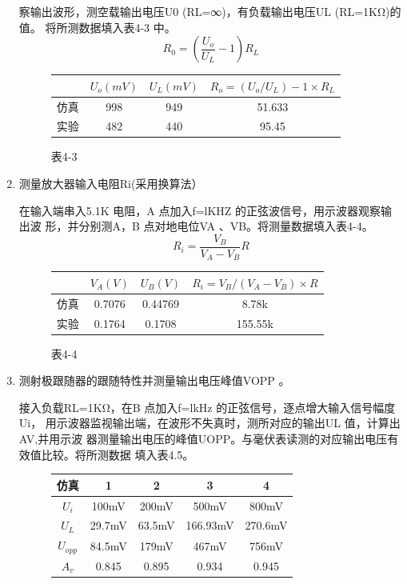 \documentclass[a4paper,10pt,notitlepage]{article}
\begin{document}
\begin{enumerate}
	察输出波形，测空载输出电压U0 (RL=∞)，有负载输出电压UL (RL=1KΩ)的值。
	将所测数据填入表4-3 中。
	$$R_0=(\frac{U_o}{U_L}-1)R_L$$
	\begin{figure}[h]
		\centering
		\begin{tabular}{|c|c|c|c|}
			\hline
			& $U_o(mV)$ & $U_L(mV)$ & $R_o=(U_o/U_L)-1 \times R_L$ \\
			\hline
			仿真 & 998 & 949 & 51.633 \\
			\hline
			实验 & 482 & 440 & 95.45  \\
			\hline
		\end{tabular}
		\caption*{表4-3}
	\end{figure}
	\item 测量放大器输入电阻Ri(采用换算法）\par 
	\qquad 在输入端串入5.1K 电阻，A 点加入f=lKHZ 的正弦波信号，用示波器观察输出波
	形，并分别测A，B 点对地电位VA 、VB。将测量数据填入表4-4。
	$$R_i=\frac{V_B}{V_A-V_B}R$$
	\begin{figure}[h]
		\centering
		\begin{tabular}{|c|c|c|c|}
			\hline
			& $V_A(V)$ & $U_B(V)$ & $R_i=V_B/(V_A-V_B) \times R$ \\
			\hline
			仿真 & 0.7076 & 0.44769 & 8.78k  \\
			\hline
			实验 & 0.1764 & 0.1708 & 155.55k  \\
			\hline
		\end{tabular}
		\caption*{表4-4 }
	\end{figure}
	\item  测射极跟随器的跟随特性并测量输出电压峰值VOPP 。\par 
	\qquad 接入负载RL=1KΩ，在B 点加入f=lkHz 的正弦信号，逐点增大输入信号幅度Ui，
	用示波器监视输出端，在波形不失真时，测所对应的输出UL 值，计算出AV,并用示波
	器测量输出电压的峰值UOPP。与毫伏表读测的对应输出电压有效值比较。将所测数据
	填入表4.5。\par 
	\begin{figure}[h]
		\begin{minipage}{0.3\textwidth}
			\begin{tabular}{|c|c|c|c|c|}
				\hline
				仿真 & 1 & 2 & 3 & 4 \\
				\hline
				$U_i$ & 100mV & 200mV & 500mV & 800mV  \\
				\hline
				$U_L$ & 29.7mV & 63.5mV & 166.93mV & 270.6mV \\
				\hline
				$U_{opp}$ & 84.5mV & 179mV & 467mV & 756mV \\
				\hline
				$A_v$ & 0.845 & 0.895 & 0.934 & 0.945 \\

\end{tabular}
\end{minipage}
\end{figure}
\end{enumerate}
\end{document}
